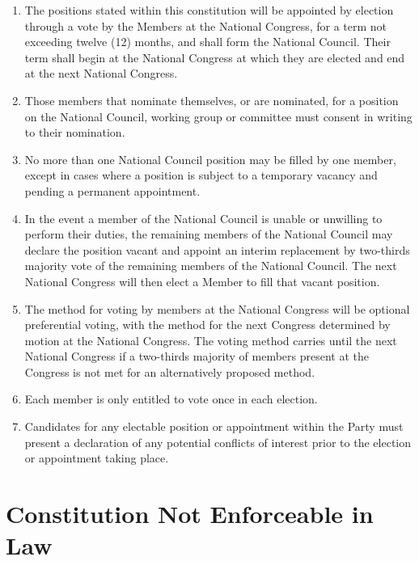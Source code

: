 \documentclass[a4paper,titlepage,8.5pt]{article}
\begin{document}
\begin{enumerate}
\item The positions stated within this constitution will be appointed by election through a vote by the Members at the National Congress, for a term not exceeding twelve (12) months, and shall form the National Council. Their term shall begin at the National Congress at which they are elected and end at the next National Congress.
\item Those members that nominate themselves, or are nominated, for a position on the National Council, working group or committee must consent in writing to their nomination.
\item No more than one National Council position may be filled by one member, except in cases where a position is subject to a temporary vacancy and pending a permanent appointment.
\item In the event a member of the National Council is unable or unwilling to perform their duties, the remaining members of the National Council may declare the position vacant and appoint an interim replacement by two-thirds majority vote of the remaining members of the National Council. The next National Congress will then elect a Member to fill that vacant position.
\item The method for voting by members at the National Congress will be optional preferential voting, with the method for the next Congress determined by motion at the National Congress. The voting method carries until the next National Congress if a two-thirds majority of members present at the Congress is not met for an alternatively proposed method.
\item Each member is only entitled to vote once in each election.
\item Candidates for any electable position or appointment within the Party must present a declaration of any potential conflicts of interest prior to the election or appointment taking place.
\end{enumerate}

\section{Constitution Not Enforceable in Law}
\end{document}
